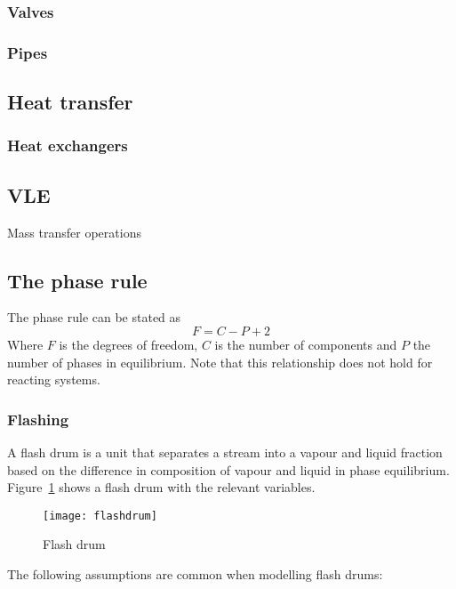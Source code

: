 \subsubsection{Valves}


\subsubsection{Pipes}


\subsection{Heat transfer}
\subsubsection{Heat exchangers}


\subsection{VLE}
Mass transfer operations 


\subsection{The phase rule}
The phase rule can be stated as \citep[499]{mccabe.smith.ea1993unit}
\begin{equation}
  \label{eq:phaserule}
  F = C - P + 2
\end{equation}
Where $F$ is the degrees of freedom, $C$ is the number of components and $P$ the number of phases in equilibrium.  
Note that this relationship does not hold for reacting systems.

\subsubsection{Flashing}
A flash drum is a unit that separates a stream into a vapour and
liquid fraction based on the difference in composition of vapour and
liquid in phase equilibrium.  Figure~\ref{fig:flashdrum} shows a flash
drum with the relevant variables.

\begin{figure}[htbp]
  \centering
  \texttt{[image: flashdrum]}
  \caption{Flash drum}
  \label{fig:flashdrum}
\end{figure}

The following assumptions are common when modelling flash drums:


